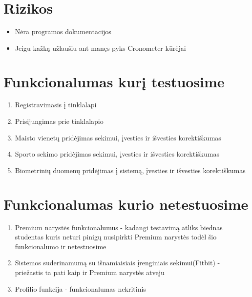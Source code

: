 \documentclass[oneside]{VUMIFPSkursinis}
\begin{document}
\section{Rizikos}
	\begin{itemize}
		\item{Nėra programos dokumentacijos}
		\item{Jeigu kažką užlaušiu ant manęs pyks Cronometer kūrėjai}
	\end{itemize}

\section{Funkcionalumas kurį testuosime}
	\begin{enumerate}
		\item{Registravimasis į tinklalapi}
		\item{Prisijungimas prie tinklalapio}
		\item{Maisto vienetų pridėjimas sekimui, įvesties ir išvesties korektiškumas}
		\item{Sporto sekimo pridėjimas sekimui, įvesties ir išvesties korektiškumas}
		\item{Biometrinių duomenų pridėjimas į sistemą, įvesties ir išvesties korektiškumas}
	\end{enumerate}
\section{Funkcionalumas kurio netestuosime}
	\begin{enumerate}
		\item{Premium narystės funkcionalumus - kadangi testavimą atliks biednas studentas kuris neturi pinigų nusipirkti Premium narystės todėl šio funkcionalumo ir netestuosime}
		\item{Sistemos suderinamumą su išnamiaisiais įrenginiais sekimui(Fitbit) - priežastis ta pati kaip ir Premium narystės atveju}
		\item{Profilio funkcija - funkcionalumas nekritinis}
	\end{enumerate}	
\end{document}
